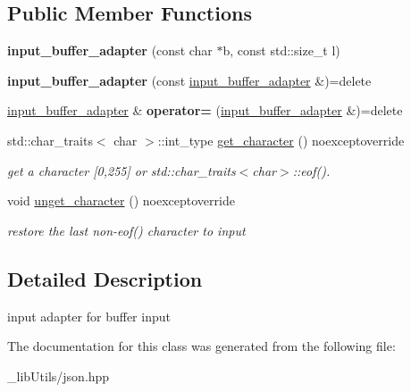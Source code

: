 \subsection*{Public Member Functions}
\begin{DoxyCompactItemize}
\item 
{\bfseries input\+\_\+buffer\+\_\+adapter} (const char $\ast$b, const std\+::size\+\_\+t l)\hypertarget{classnlohmann_1_1detail_1_1input__buffer__adapter_aee9d094d369bcd8f110eae4a175a8fa9}{}\label{classnlohmann_1_1detail_1_1input__buffer__adapter_aee9d094d369bcd8f110eae4a175a8fa9}

\item 
{\bfseries input\+\_\+buffer\+\_\+adapter} (const \hyperlink{classnlohmann_1_1detail_1_1input__buffer__adapter}{input\+\_\+buffer\+\_\+adapter} \&)=delete\hypertarget{classnlohmann_1_1detail_1_1input__buffer__adapter_ada76d7b75c5d6b989af0e18687ef07b6}{}\label{classnlohmann_1_1detail_1_1input__buffer__adapter_ada76d7b75c5d6b989af0e18687ef07b6}

\item 
\hyperlink{classnlohmann_1_1detail_1_1input__buffer__adapter}{input\+\_\+buffer\+\_\+adapter} \& {\bfseries operator=} (\hyperlink{classnlohmann_1_1detail_1_1input__buffer__adapter}{input\+\_\+buffer\+\_\+adapter} \&)=delete\hypertarget{classnlohmann_1_1detail_1_1input__buffer__adapter_a0871125057d993684ba8e45fb2b8a76b}{}\label{classnlohmann_1_1detail_1_1input__buffer__adapter_a0871125057d993684ba8e45fb2b8a76b}

\item 
std\+::char\+\_\+traits$<$ char $>$\+::int\+\_\+type \hyperlink{classnlohmann_1_1detail_1_1input__buffer__adapter_a3a8ded2e453b8372353aed38302f30f1}{get\+\_\+character} () noexceptoverride\hypertarget{classnlohmann_1_1detail_1_1input__buffer__adapter_a3a8ded2e453b8372353aed38302f30f1}{}\label{classnlohmann_1_1detail_1_1input__buffer__adapter_a3a8ded2e453b8372353aed38302f30f1}

\begin{DoxyCompactList}\small\item\em get a character \mbox{[}0,255\mbox{]} or std\+::char\+\_\+traits$<$char$>$\+::eof(). \end{DoxyCompactList}\item 
void \hyperlink{classnlohmann_1_1detail_1_1input__buffer__adapter_a428d0ad853394233bffb8ceae9871a63}{unget\+\_\+character} () noexceptoverride\hypertarget{classnlohmann_1_1detail_1_1input__buffer__adapter_a428d0ad853394233bffb8ceae9871a63}{}\label{classnlohmann_1_1detail_1_1input__buffer__adapter_a428d0ad853394233bffb8ceae9871a63}

\begin{DoxyCompactList}\small\item\em restore the last non-\/eof() character to input \end{DoxyCompactList}\end{DoxyCompactItemize}


\subsection{Detailed Description}
input adapter for buffer input 

The documentation for this class was generated from the following file\+:\begin{DoxyCompactItemize}
\item 
\+\_\+lib\+Utils/json.\+hpp\end{DoxyCompactItemize}
